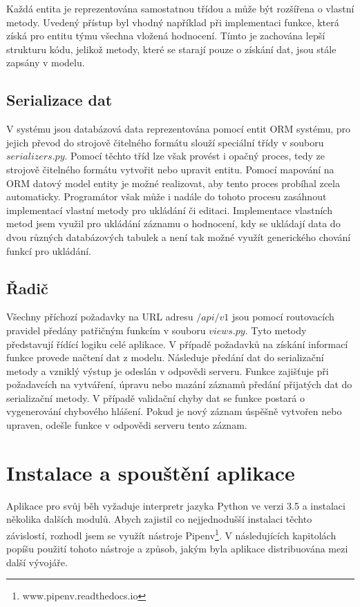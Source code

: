\documentclass[
  digital, %
  twoside, %
  table,   %
  lof,     %
  lot,     %
]{fithesis3}
\begin{document}
Každá entita je reprezentována samostatnou třídou a může být rozšířena o vlastní metody. Uvedený přístup byl vhodný například při implementaci funkce, která získá pro entitu týmu všechna vložená hodnocení. Tímto je zachována lepší strukturu kódu, jelikož metody, které se starají pouze o získání dat, jsou stále zapsány v modelu.

\subsection{Serializace dat}
\label{serializer}
V systému jsou databázová data reprezentována pomocí entit ORM systému, pro jejich převod do strojově čitelného formátu slouží speciální třídy v souboru $serializers.py$. Pomocí těchto tříd lze však provést i opačný proces, tedy ze strojově čitelného formátu vytvořit nebo upravit entitu. Pomocí mapování na ORM datový model entity je možné realizovat, aby tento proces probíhal zcela automaticky. Programátor však může i nadále do tohoto procesu zasáhnout implementací vlastní metody pro ukládání či editaci. Implementace vlastních metod jsem využil pro ukládání záznamu o hodnocení, kdy se ukládají data do dvou různých databázových tabulek a není tak možné využít generického chování funkcí pro ukládání.

\subsection{Řadič}
\label{radic}
Všechny příchozí požadavky na URL adresu $/api/v1$ jsou pomocí routovacích pravidel předány patřičným funkcím v souboru $views.py$. Tyto metody představují řídící logiku celé aplikace. V případě požadavků na získání informací funkce provede načtení dat z modelu. Následuje předání dat do serializační metody a vzniklý výstup je odeslán v odpovědi serveru. Funkce zajišťuje při požadavcích na vytváření, úpravu nebo mazání záznamů předání přijatých dat do serializační metody. V případě validační chyby dat se funkce postará o vygenerování chybového hlášení. Pokud je nový záznam úspěšně vytvořen nebo upraven, odešle funkce v odpovědi serveru tento záznam.

\section{Instalace a spouštění aplikace}
Aplikace pro svůj běh vyžaduje interpretr jazyka Python ve verzi 3.5 a instalaci několika dalších modulů. Abych zajistil co nejjednodušší instalaci těchto závislostí, rozhodl jsem se využít nástroje Pipenv\footnote{www.pipenv.readthedocs.io}. V následujících kapitolách popíšu použití tohoto nástroje a způsob, jakým byla aplikace distribuována mezi další vývojáře.
\end{document}
